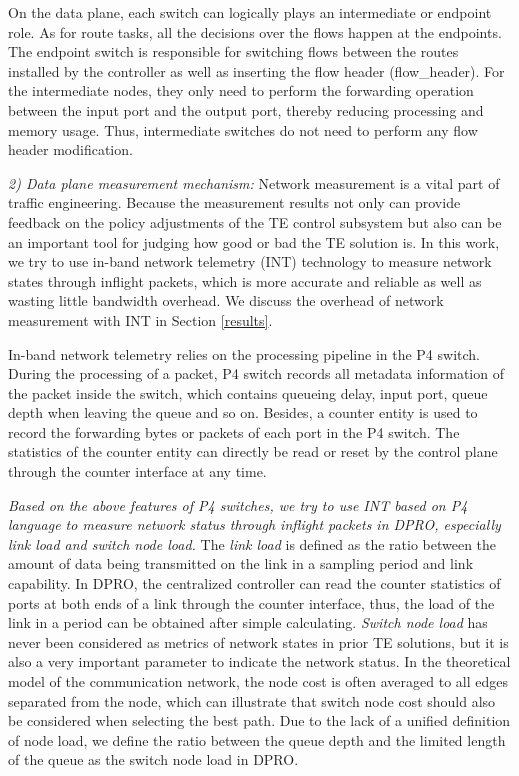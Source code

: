 \documentclass[10pt,conference]{IEEEtran}
\begin{document}
On the data plane, each switch can logically plays an intermediate or endpoint role. As for route tasks, all the decisions over the flows happen at the endpoints. The endpoint switch is responsible for switching flows between the routes installed by the controller as well as inserting the flow header (flow\_header). For the intermediate nodes, they only need to perform the forwarding operation between the input port and the output port, thereby reducing processing and memory usage. Thus, intermediate switches do not need to perform any flow header modification.

\emph{2) Data plane measurement mechanism:} Network measurement is a vital part of traffic engineering. Because the measurement results not only can provide feedback on the policy adjustments of the TE control subsystem but also can be an important tool for judging how good or bad the TE solution is. In this work, we try to use in-band network telemetry (INT) \cite{kim2015band} technology to measure network states through inflight packets, which is more accurate and reliable as well as wasting little bandwidth overhead. We discuss the overhead of network measurement with INT in Section \ref{results}.

In-band network telemetry relies on the processing pipeline in the P4 switch. During the processing of a packet, P4 switch records all metadata information of the packet inside the switch, which contains queueing delay, input port, queue depth when leaving the queue and so on. Besides, a counter entity is used to record the forwarding bytes or packets of each port in the P4 switch. The statistics of the counter entity can directly be read or reset by the control plane through the counter interface at any time.

\emph{Based on the above features of P4 switches, we try to use INT based on P4 language to measure network status through inflight packets in DPRO, especially link load and switch node load. }The \emph{link load} is defined as the ratio between the amount of data being transmitted on the link in a sampling period and link capability. In DPRO, the centralized controller can read the counter statistics of ports at both ends of a link through the counter interface, thus, the load of the link in a period can be obtained after simple calculating. \emph{Switch node load} has never been considered as metrics of network states in prior TE solutions, but it is also a very important parameter to indicate the network status. In the theoretical model of the communication network, the node cost is often averaged to all edges separated from the node, which can illustrate that switch node cost should also be considered when selecting the best path. Due to the lack of a unified definition of node load, we define the ratio between the queue depth and the limited length of the queue as the switch node load in DPRO.
\end{document}
